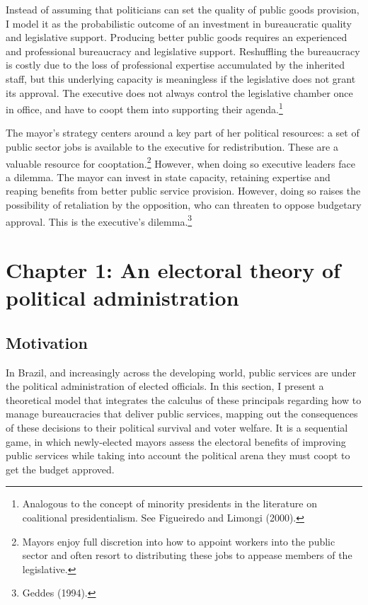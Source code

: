 \documentclass[12pt,]{article}
\let\rmarkdownfootnote\footnote%
\def\footnote{\protect\rmarkdownfootnote}
\begin{document}
Instead of assuming that politicians can set the quality of public goods
provision, I model it as the probabilistic outcome of an investment in
bureaucratic quality and legislative support. Producing better public
goods requires an experienced and professional bureaucracy and
legislative support. Reshuffling the bureaucracy is costly due to the
loss of professional expertise accumulated by the inherited staff, but
this underlying capacity is meaningless if the legislative does not
grant its approval. The executive does not always control the
legislative chamber once in office, and have to coopt them into
supporting their agenda.\footnote{Analogous to the concept of minority
  presidents in the literature on coalitional presidentialism. See
  Figueiredo and Limongi (2000).}

The mayor's strategy centers around a key part of her political
resources: a set of public sector jobs is available to the executive for
redistribution. These are a valuable resource for cooptation.\footnote{Mayors
  enjoy full discretion into how to appoint workers into the public
  sector and often resort to distributing these jobs to appease members
  of the legislative.} However, when doing so executive leaders face a
dilemma. The mayor can invest in state capacity, retaining expertise and
reaping benefits from better public service provision. However, doing so
raises the possibility of retaliation by the opposition, who can
threaten to oppose budgetary approval. This is the executive's
dilemma.\footnote{Geddes (1994).}

\pagebreak

\hypertarget{chapter-1-an-electoral-theory-of-political-administration}{%
\section{Chapter 1: An electoral theory of political
administration}\label{chapter-1-an-electoral-theory-of-political-administration}}

\hypertarget{motivation}{%
\subsection{Motivation}\label{motivation}}

In Brazil, and increasingly across the developing world, public services
are under the political administration of elected officials. In this
section, I present a theoretical model that integrates the calculus of
these principals regarding how to manage bureaucracies that deliver
public services, mapping out the consequences of these decisions to
their political survival and voter welfare. It is a sequential game, in
which newly-elected mayors assess the electoral benefits of improving
public services while taking into account the political arena they must
coopt to get the budget approved.
\end{document}
